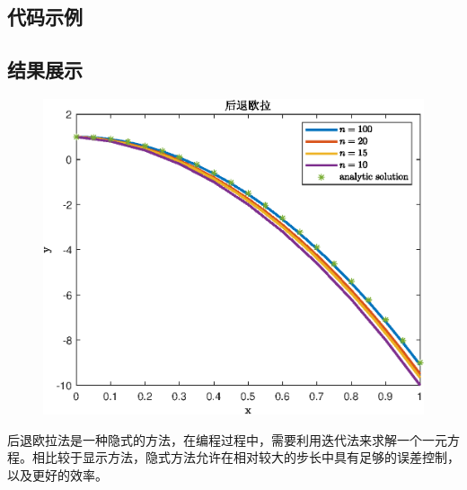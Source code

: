 \documentclass{ctexart}
\numberwithin{equation}{section}    %
\begin{document}
\subsection{代码示例}


\subsection{结果展示}
\begin{figure}[htp]
    \centering
    \includegraphics[width=0.7\linewidth]{fig/后退欧拉}
\end{figure}
后退欧拉法是一种隐式的方法，在编程过程中，需要利用迭代法来求解一个一元方程。相比较于显示方法，隐式方法允许在相对较大的步长中具有足够的误差控制，以及更好的效率。
\end{document}

